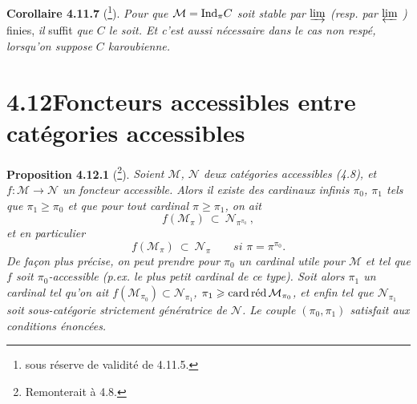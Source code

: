 \textbf{Corollaire 4.11.7} (\footnote{sous réserve de validité de 4.11.5.}). \textit{Pour que $\mathcal{M} = \Ind_\pi C$ soit stable par $\varinjlim$ (resp. par $\varprojlim$ )} finies, \textit{il} suffit \textit{que $C$ le soit. Et c'est aussi nécessaire dans le cas non respé, lorsqu'on suppose $C$ karoubienne.}

\section*{4.12\quad Foncteurs accessibles entre catégories accessibles}

\textbf{Proposition 4.12.1} (\footnote{Remonterait à 4.8.}). \textit{Soient $\mathcal{M}$, $\mathcal{N}$ deux catégories accessibles (4.8), et $f : \mathcal{M} \longrightarrow \mathcal{N}$ un foncteur accessible. Alors il existe des cardinaux infinis $\pi_0$, $\pi_1$ tels que $\pi_1 \geqslant \pi_0$ et que pour tout cardinal $\pi \geqslant \pi_1$, on ait}
\[
f(\mathcal{M}_\pi) \ \subset \ \mathcal{N}_{\pi^{\pi_0}} \ , \tag*{(4.12.1)} %
\]
\textit{et en particulier}
\[
f(\mathcal{M}_\pi) \ \subset \ \mathcal{N}_\pi \qquad \textit{si } \pi = \pi^{\pi_0}. \tag*{(4.12.1.2)}
\]
\textit{De façon plus précise, on peut prendre pour $\pi_0$ un cardinal utile pour $\mathcal{M}$}  \textit{et tel que $f$ soit $\pi_0$-accessible (p.ex. le plus petit cardinal de ce type). Soit alors $\pi_1$ un cardinal tel qu'on ait $f(\mathcal{M}_{\pi_0}) \subset \mathcal{N}_{\pi_1}$, $\pi_1 \geqslant \cardred \mathcal{M}_{\pi_0}$, et enfin tel que $\mathcal{N}_{\pi_1}$ soit} \textit{sous-catégorie strictement génératrice de $\mathcal{N}$. Le couple $(\pi_0,\pi_1)$ satisfait aux conditions énoncées.}

